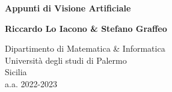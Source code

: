 \documentclass{subfiles}
\begin{document}
\begin{titlepage}
    \begin{center}
        \vspace*{1cm}

        \textbf{Appunti di Visione Artificiale}

        \vspace{1.5cm}

        \textbf{Riccardo Lo Iacono \& Stefano Graffeo}

        \vfill

        \vspace{0.8cm}

        Dipartimento di Matematica \& Informatica\\
        Università degli studi di Palermo\\
        Sicilia\\
        a.a. 2022-2023

    \end{center}
\end{titlepage}
\end{document}
